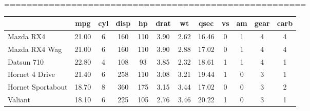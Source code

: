%
%
======================================================
\begin{tabular}{lccccccccccc}
\hline
\textbf{} & \textbf{mpg} & \textbf{cyl} & \textbf{disp} & \textbf{hp} & \textbf{drat} & \textbf{wt} & \textbf{qsec} & \textbf{vs} & \textbf{am} & \textbf{gear} & \textbf{carb} \\
\hline
Mazda RX4 & 21.00 & 6 & 160 & 110 & 3.90 & 2.62 & 16.46 & 0 & 1 & 4 & 4\\
Mazda RX4 Wag & 21.00 & 6 & 160 & 110 & 3.90 & 2.88 & 17.02 & 0 & 1 & 4 & 4\\
Datsun 710 & 22.80 & 4 & 108 & 93 & 3.85 & 2.32 & 18.61 & 1 & 1 & 4 & 1\\
Hornet 4 Drive & 21.40 & 6 & 258 & 110 & 3.08 & 3.21 & 19.44 & 1 & 0 & 3 & 1\\
Hornet Sportabout & 18.70 & 8 & 360 & 175 & 3.15 & 3.44 & 17.02 & 0 & 0 & 3 & 2\\
Valiant & 18.10 & 6 & 225 & 105 & 2.76 & 3.46 & 20.22 & 1 & 0 & 3 & 1\\
\hline
\end{tabular}
